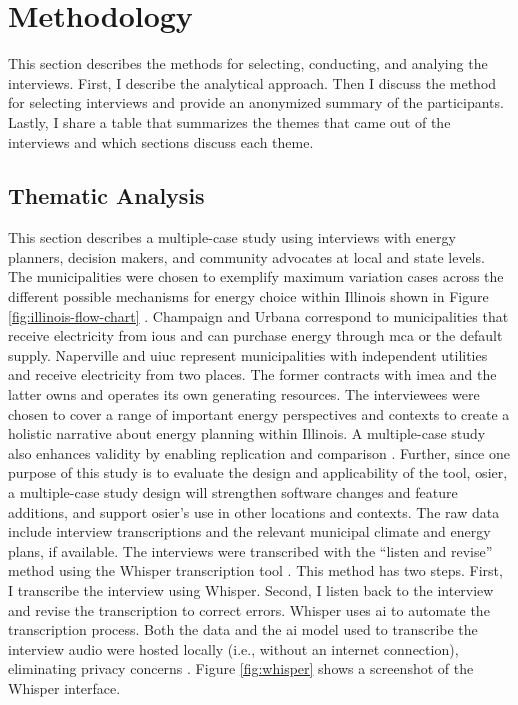 \section{Methodology}
\label{section:interview-methods}

This section describes the methods for selecting, conducting, and analying the
interviews. First, I describe the analytical approach. Then I discuss the method
for selecting interviews and provide an anonymized summary of the participants.
Lastly, I share a table that summarizes the themes that came out of the
interviews and which sections discuss each theme.


\subsection{Thematic Analysis}
This section describes a multiple-case study using interviews with energy
planners, decision makers, and community advocates at local and state levels.
The municipalities were chosen to exemplify maximum variation cases across the
different possible mechanisms for energy choice within Illinois shown in Figure
\ref{fig:illinois-flow-chart} \cite{flyvbjerg_five_2006}. Champaign and Urbana 
correspond to municipalities that receive electricity from \acp{iou} and 
can purchase energy through \ac{mca} or the default supply. Naperville and \ac{uiuc}
represent municipalities with independent utilities and receive electricity 
from two places. The former contracts with \ac{imea} and the latter owns and operates
its own generating resources. The interviewees were
chosen to cover a range of important energy perspectives and contexts to
create a holistic narrative about energy planning within Illinois. A
multiple-case study also enhances validity by enabling replication and
comparison \cite{johannsen_designing_2021, yin_case_2018}. Further, since one
purpose of this study is to evaluate the design and applicability of the tool,
\ac{osier}, a multiple-case study design will strengthen software changes and
feature additions, and support \ac{osier}'s use in other locations and contexts.
The raw data include interview transcriptions and the relevant municipal climate
and energy plans, if available. The interviews were transcribed with the
``listen and revise'' method using the Whisper transcription tool
\cite{battaglia_listen_2024}. This method has two steps. First, I transcribe the
interview using Whisper. Second, I listen back to the interview and revise the
transcription to correct errors. Whisper uses \ac{ai} to automate the
transcription process. Both the data and the \ac{ai} model used to transcribe
the interview audio were hosted locally (i.e., without an internet connection),
eliminating privacy concerns \cite{battaglia_listen_2024}. Figure
\ref{fig:whisper} shows a screenshot of the Whisper interface. 

